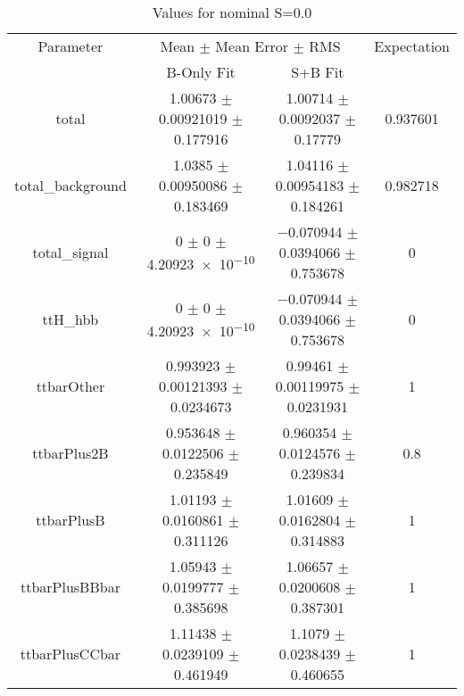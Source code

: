 \begin{table}
\centering
\caption{Values for nominal S=0.0}
\begin{tabular}{cccc}
\toprule
Parameter & \multicolumn{2}{c}{Mean $\pm$ Mean Error $\pm$ RMS} & Expectation\\
 & B-Only Fit & S+B Fit & \\
\midrule
total & \num{1.00673} $\pm$ \num{0.00921019} $\pm$ \num{0.177916} & \num{1.00714} $\pm$ \num{0.0092037} $\pm$ \num{0.17779} & \num{0.937601}\\
total\_background & \num{1.0385} $\pm$ \num{0.00950086} $\pm$ \num{0.183469} & \num{1.04116} $\pm$ \num{0.00954183} $\pm$ \num{0.184261} & \num{0.982718}\\
total\_signal & \num{0} $\pm$ \num{0} $\pm$ \num{4.20923e-10} & \num{-0.070944} $\pm$ \num{0.0394066} $\pm$ \num{0.753678} & \num{0}\\
ttH\_hbb & \num{0} $\pm$ \num{0} $\pm$ \num{4.20923e-10} & \num{-0.070944} $\pm$ \num{0.0394066} $\pm$ \num{0.753678} & \num{0}\\
ttbarOther & \num{0.993923} $\pm$ \num{0.00121393} $\pm$ \num{0.0234673} & \num{0.99461} $\pm$ \num{0.00119975} $\pm$ \num{0.0231931} & \num{1}\\
ttbarPlus2B & \num{0.953648} $\pm$ \num{0.0122506} $\pm$ \num{0.235849} & \num{0.960354} $\pm$ \num{0.0124576} $\pm$ \num{0.239834} & \num{0.8}\\
ttbarPlusB & \num{1.01193} $\pm$ \num{0.0160861} $\pm$ \num{0.311126} & \num{1.01609} $\pm$ \num{0.0162804} $\pm$ \num{0.314883} & \num{1}\\
ttbarPlusBBbar & \num{1.05943} $\pm$ \num{0.0199777} $\pm$ \num{0.385698} & \num{1.06657} $\pm$ \num{0.0200608} $\pm$ \num{0.387301} & \num{1}\\
ttbarPlusCCbar & \num{1.11438} $\pm$ \num{0.0239109} $\pm$ \num{0.461949} & \num{1.1079} $\pm$ \num{0.0238439} $\pm$ \num{0.460655} & \num{1}\\
\bottomrule
\end{tabular}
\end{table}